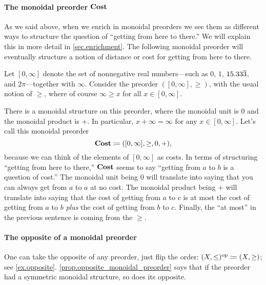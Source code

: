 \documentclass[7Sketches]{subfiles}
\begin{document}
\paragraph{The monoidal preorder $\mathbf{Cost}$}

As we said above, when we enrich in monoidal preorders we see them as different ways to structure the question of ``getting from here to there.'' We will explain this in more detail in \cref{sec.enrichment}. The following monoidal preorder will eventually structure a notion of distance or cost for getting from here to there.

\begin{example}%
\label{ex.Lawveres_base}%
Let $[0,\infty]$ denote the set of nonnegative real numbers---such as $0$, $1$, $15.33\overline{3}$, and $2\pi$---together with $\infty$. Consider the preorder $([0,\infty],\geq)$, with the usual notion of $\geq$, where of course $\infty\geq x$ for all $x\in[0,\infty]$.

There is a monoidal structure on this preorder, where the monoidal unit is $0$ and the monoidal product is $+$. In particular, $x+\infty=\infty$ for any $x\in[0,\infty]$. Let's call this monoidal preorder
\[
\mathbf{Cost}\coloneqq([0,\infty],\geq,0,+),
\]
because we can think of the elements of $[0,\infty]$ as costs. In terms of structuring
``getting from here to there,'' $\mathbf{Cost}$ seems to say ``getting
from $a$ to $b$ is a question of cost.'' The monoidal unit being $0$ will
translate into saying that you can always get from $a$ to $a$ at no cost. The
monoidal product being $+$ will translate into saying that the cost of getting
from $a$ to $c$ is at most the cost of getting from $a$ to $b$ \emph{plus} the cost of getting from $b$ to $c$. Finally, the ``at most'' in the previous sentence is coming from the $\geq$.
\end{example}

\paragraph{The opposite of a monoidal preorder}

One can take the opposite of any preorder, just flip the order: $(X,\leq)^{\textnormal{op}}\coloneqq(X,\geq)$; see \cref{ex.opposite}. \cref{prop.opposite_monoidal_preorder} says that if the preorder had a symmetric monoidal structure, so does its opposite.
\end{document}
